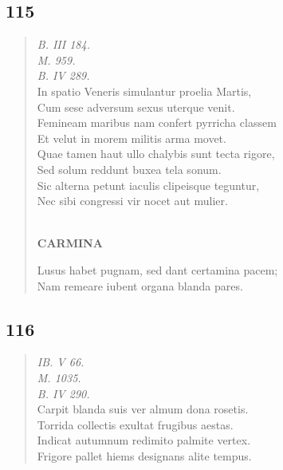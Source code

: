 \documentclass[11pt, a4paper]{report}
\begin{document}
            \subsection*{115}
      \begin{verse}
      \textit{B. III 184.} \\ \textit{M. 959.} \\ \textit{B. IV 289.} \\ In spatio Veneris simulantur proelia Martis, \\ Cum sese adversum sexus uterque venit. \\ Femineam maribus nam confert pyrricha classem \\ Et velut in morem militis arma movet. \\ Quae tamen haut ullo chalybis sunt tecta rigore, \\ Sed solum reddunt buxea tela sonum. \\ Sic alterna petunt iaculis clipeisque teguntur, \\ Nec sibi congressi vir nocet aut mulier. \\ 
        ﻿\pagebreak 
     \marginpar{[10]} \begin{center} \textbf{CARMINA} \end{center}Lusus habet pugnam, sed dant certamina pacem; \\ Nam remeare iubent organa blanda pares. \\ 
      \end{verse}
  
            \subsection*{116}
      \begin{verse}
      \textit{IB. V 66.} \\ \textit{M. 1035.} \\ \textit{B. IV 290.} \\ Carpit blanda suis ver almum dona rosetis. \\ Torrida collectis exultat frugibus aestas. \\ Indicat autumnum redimito palmite vertex. \\ Frigore pallet hiems designans alite tempus. \\ 
      \end{verse}
  
\end{document}
